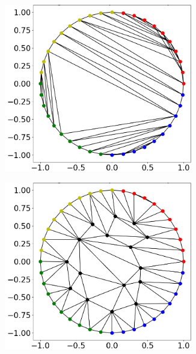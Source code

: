 \begin{figure}
  \hspace{-12mm}
  \begin{subfigure}[t]{0.31\textwidth}%
    \centering%
    \includegraphics[width=0.9\textwidth, trim=37mm 14mm 6mm 6mm, clip, angle=225,origin=c]{images/fiber_creation/mesh_plots/out_0_0_0_tri.png}%
    \label{fig:w_00}%
  \end{subfigure}
  \quad
  \begin{subfigure}[t]{0.31\textwidth}%
    \centering%
    \includegraphics[width=0.9\textwidth, trim=37mm 14mm 6mm 6mm, clip, angle=225,origin=c]{images/fiber_creation/mesh_plots/out_1_0_0_tri.png}%

\end{subfigure}
\end{figure}
